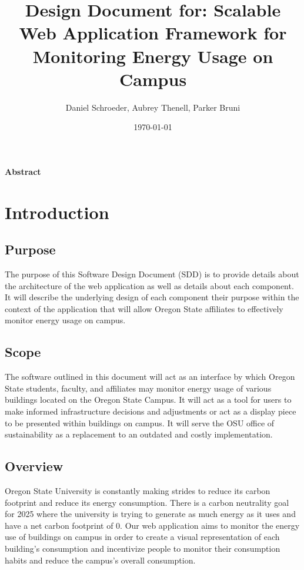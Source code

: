 \documentclass[journal,10pt,onecolumn,compsoc]{IEEEtran}
\title{Design Document for: \linebreak Scalable Web Application Framework for Monitoring Energy Usage on Campus}
\author{Daniel Schroeder, Aubrey Thenell, Parker Bruni}
\date{\today}
\begin{document}
    \maketitle
    \vspace{2cm}
    \begin{center}
    \noindent \textbf{Abstract} \\
                \indent 
                
                
    \end{center}         
    
    \newpage
    \tableofcontents
    \clearpage
    
    \section{Introduction}
    \subsection{Purpose}
	
    The purpose of this Software Design Document (SDD) is to provide details about the architecture of the web application as well
	as details about each component. It will describe the underlying design of each component their purpose within the context
	of the application that will allow Oregon State affiliates to effectively monitor energy usage on campus.
	
    \subsection{Scope}
    
	The software outlined in this document will act as an interface by which Oregon State students, faculty, and affiliates
	may monitor energy usage of various buildings located on the Oregon State Campus. It will act as a tool for users to 
	make informed infrastructure decisions and adjustments or act as a display piece to be presented within buildings on campus.
	It will serve the OSU office of sustainability as a replacement to an outdated and costly implementation. 
	
    \subsection{Overview}
    Oregon State University is constantly making strides to reduce its carbon footprint and reduce its energy consumption. There is a carbon neutrality goal for 2025 where the university is trying to generate as much energy as it uses and have a net carbon footprint of 0. Our web application aims to monitor the energy use of buildings on campus in order to create a visual representation of each building's consumption and incentivize people to monitor their consumption habits and reduce the campus's overall consumption.
\end{document}
